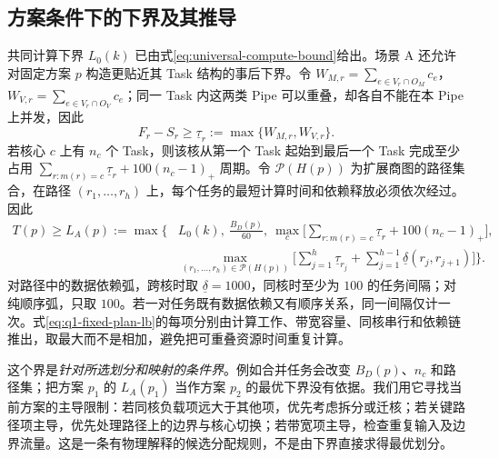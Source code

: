 \subsection{方案条件下的下界及其推导}
共同计算下界 $L_0(k)$ 已由式\eqref{eq:universal-compute-bound}给出。场景 A 还允许对固定方案 $p$ 构造更贴近其 Task 结构的事后下界。令 $W_{M,r}=\sum_{e\in V_r\cap O_M}c_e$，$W_{V,r}=\sum_{e\in V_r\cap O_V}c_e$；同一 Task 内这两类 Pipe 可以重叠，却各自不能在本 Pipe 上并发，因此
\begin{equation}\label{eq:q1-task-min-duration}
F_r-S_r\ge \underline\tau_r:=\max\{W_{M,r},W_{V,r}\}.
\end{equation}
若核心 $c$ 上有 $n_c$ 个 Task，则该核从第一个 Task 起始到最后一个 Task 完成至少占用 $\sum_{r:m(r)=c}\underline\tau_r+100(n_c-1)_+$ 周期。令 $\mathcal P(H(p))$ 为扩展商图的路径集合，在路径 $(r_1,\ldots,r_h)$ 上，每个任务的最短计算时间和依赖释放必须依次经过。因此
\begin{align}\label{eq:q1-fixed-plan-lb}
T(p)\ge L_A(p):=\max\Bigg\{&
L_0(k),\ \frac{B_D(p)}{60},\
\max_c\bigg[\sum_{r:m(r)=c}\underline\tau_r+100(n_c-1)_+\bigg],\\
&\max_{(r_1,\ldots,r_h)\in\mathcal P(H(p))}
\bigg[\sum_{j=1}^{h}\underline\tau_{r_j}
+\sum_{j=1}^{h-1}\underline\delta(r_j,r_{j+1})\bigg]\Bigg\}.\nonumber
\end{align}
对路径中的数据依赖弧，跨核时取 $\underline\delta=1000$，同核时至少为 $100$ 的任务间隔；对纯顺序弧，只取 $100$。若一对任务既有数据依赖又有顺序关系，同一间隔仅计一次。式\eqref{eq:q1-fixed-plan-lb}的每项分别由计算工作、带宽容量、同核串行和依赖链推出，取最大而不是相加，避免把可重叠资源时间重复计算。

这个界是\emph{针对所选划分和映射的条件界}。例如合并任务会改变 $B_D(p)$、$n_c$ 和路径集；把方案 $p_1$ 的 $L_A(p_1)$ 当作方案 $p_2$ 的最优下界没有依据。我们用它寻找当前方案的主导限制：若同核负载项远大于其他项，优先考虑拆分或迁核；若关键路径项主导，优先处理路径上的边界与核心切换；若带宽项主导，检查重复输入及边界流量。这是一条有物理解释的候选分配规则，不是由下界直接求得最优划分。

